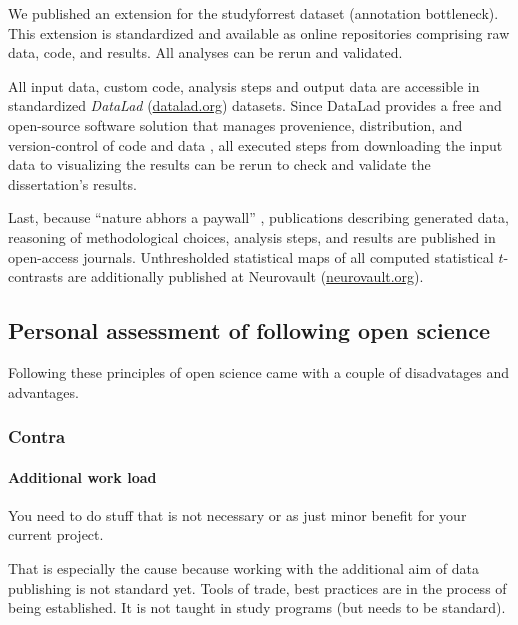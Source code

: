 
We published an extension for the studyforrest dataset (annotation bottleneck).
%
This extension is standardized and available as online repositories comprising
raw data, code, and results.
%
All analyses can be rerun and validated.

All input data, custom code, analysis steps and output data are accessible in
standardized \textit{DataLad} (\href{www.datalad.org}{datalad.org}) datasets.
Since DataLad provides a free and open-source software solution that manages
provenience, distribution, and version-control of code and data
\citep{halchenko2021datalad}, all executed steps from downloading the input data
to visualizing the results can be rerun to check and validate the dissertation's
results.

Last, because ``nature abhors a paywall'' \citep{dupre2020nature}, publications
describing generated data, reasoning of methodological choices, analysis steps,
and results are published in open-access journals.
Unthresholded statistical maps of all computed statistical $t$-contrasts are
additionally published at Neurovault
(\href{https://neurovault.org/}{neurovault.org}).

\subsection{Personal assessment of following open science}

Following these principles of open science came with a couple of disadvatages
and advantages.


\subsubsection{Contra}

\paragraph{Additional work load}

You need to do stuff that is not necessary or as just minor benefit for your
current project.

%
That is especially the cause because working with the additional aim of data
publishing is not standard yet.
%
Tools of trade, best practices are in the process of being established.
%
It is not taught in study programs (but needs to be standard).



